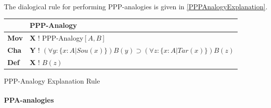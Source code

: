                	 \noindent The dialogical rule for performing PPP-analogies is given in \autoref{PPPAnalogyExplanation}.
               	 
               		\begin{Scheme}[H]\footnotesize
               		\centering
               		\begin{tabular}{l l}
               			                   & \textbf{PPP-Analogy}                                                                                                                                                                                                                                                                               \\ \toprule
               			\textbf{Mov}      & \textbf{X} ! PPP-Analogy$[A,B]$                                                                                                                                                                                                                                                                                     \\ \midrule
               			\textbf{Cha} & \textbf{Y} ! $(\forall y: \{ x: A| Sou(x)\} ) B(y) \supset (\forall z : \{ x: A| Tar(x)\} ) B(z)$                                                                                                                                                                                                                                                                                      \\ \midrule
               			\textbf{Def}   & \textbf{X} ! $B(z)$ \\ \bottomrule
               		\end{tabular}
               		\caption{PPP-Analogy Explanation Rule}
               		\label{PPPAnalogyExplanation}
					\end{Scheme}

			\newpage
			\paragraph{PPA-analogies}
			
